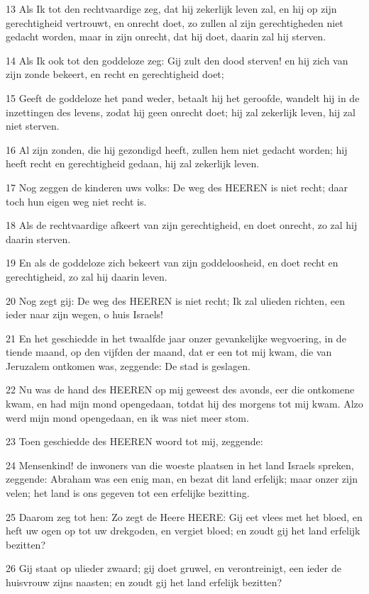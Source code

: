 \par 13 Als Ik tot den rechtvaardige zeg, dat hij zekerlijk leven zal, en hij op zijn gerechtigheid vertrouwt, en onrecht doet, zo zullen al zijn gerechtigheden niet gedacht worden, maar in zijn onrecht, dat hij doet, daarin zal hij sterven.
\par 14 Als Ik ook tot den goddeloze zeg: Gij zult den dood sterven! en hij zich van zijn zonde bekeert, en recht en gerechtigheid doet;
\par 15 Geeft de goddeloze het pand weder, betaalt hij het geroofde, wandelt hij in de inzettingen des levens, zodat hij geen onrecht doet; hij zal zekerlijk leven, hij zal niet sterven.
\par 16 Al zijn zonden, die hij gezondigd heeft, zullen hem niet gedacht worden; hij heeft recht en gerechtigheid gedaan, hij zal zekerlijk leven.
\par 17 Nog zeggen de kinderen uws volks: De weg des HEEREN is niet recht; daar toch hun eigen weg niet recht is.
\par 18 Als de rechtvaardige afkeert van zijn gerechtigheid, en doet onrecht, zo zal hij daarin sterven.
\par 19 En als de goddeloze zich bekeert van zijn goddeloosheid, en doet recht en gerechtigheid, zo zal hij daarin leven.
\par 20 Nog zegt gij: De weg des HEEREN is niet recht; Ik zal ulieden richten, een ieder naar zijn wegen, o huis Israels!
\par 21 En het geschiedde in het twaalfde jaar onzer gevankelijke wegvoering, in de tiende maand, op den vijfden der maand, dat er een tot mij kwam, die van Jeruzalem ontkomen was, zeggende: De stad is geslagen.
\par 22 Nu was de hand des HEEREN op mij geweest des avonds, eer die ontkomene kwam, en had mijn mond opengedaan, totdat hij des morgens tot mij kwam. Alzo werd mijn mond opengedaan, en ik was niet meer stom.
\par 23 Toen geschiedde des HEEREN woord tot mij, zeggende:
\par 24 Mensenkind! de inwoners van die woeste plaatsen in het land Israels spreken, zeggende: Abraham was een enig man, en bezat dit land erfelijk; maar onzer zijn velen; het land is ons gegeven tot een erfelijke bezitting.
\par 25 Daarom zeg tot hen: Zo zegt de Heere HEERE: Gij eet vlees met het bloed, en heft uw ogen op tot uw drekgoden, en vergiet bloed; en zoudt gij het land erfelijk bezitten?
\par 26 Gij staat op ulieder zwaard; gij doet gruwel, en verontreinigt, een ieder de huisvrouw zijns naasten; en zoudt gij het land erfelijk bezitten?
